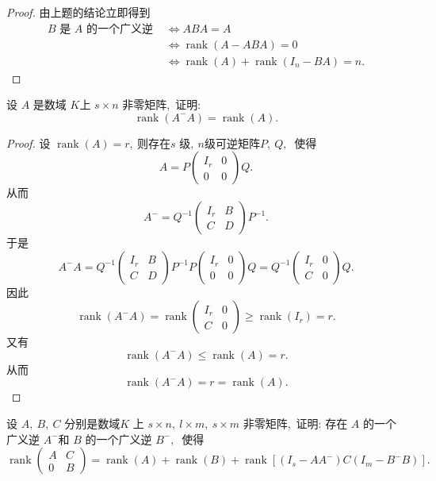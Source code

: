 \begin{proof}
	由上题的结论立即得到
	$$\begin{aligned}
		B \text { 是 } A \text { 的一个广义逆 } & \Longleftrightarrow A B A=A \\
		& \Longleftrightarrow \operatorname{rank}(A-A B A)=0 \\
		& \Longleftrightarrow \operatorname{rank}(A)+\operatorname{rank}\left(I_{n}-B A\right)=n .
	\end{aligned}$$
\end{proof}
\newpage
\begin{problem}
	设  $A$  是数域 $ K  $上 $ s \times n $ 非零矩阵,\  证明:
	$$\operatorname{rank}\left(A^{-} A\right)=\operatorname{rank}(A) .$$
\end{problem}
\begin{proof}
	设 $ \operatorname{rank}(A)=r ,\  $则存在$  s $ 级$,\ n  $级可逆矩阵$  P,\  Q ,\ $ 使得
	$$A=P\left(\begin{array}{ll}
		I_{r} & 0 \\
		0 & 0
	\end{array}\right) Q .$$
	从而
	$$A^{-}=Q^{-1}\left(\begin{array}{ll}
		I_{r} & B \\
		C & D
	\end{array}\right) P^{-1} .$$
	于是
	$$A^{-} A=Q^{-1}\left(\begin{array}{ll}
		I_{r} & B \\
		C & D
	\end{array}\right) P^{-1} P\left(\begin{array}{cc}
		I_{r} & 0 \\
		0 & 0
	\end{array}\right) Q=Q^{-1}\left(\begin{array}{ll}
		I_{r} & 0 \\
		C & 0
	\end{array}\right) Q .$$
	因此
	$$ \operatorname{rank}\left(A^{-} A\right)=\operatorname{rank}\left(\begin{array}{ll}I_{r} & 0 \\ C & 0\end{array}\right) \geqslant \operatorname{rank}\left(I_{r}\right)=r .$$
	又有
	$$\operatorname{rank}(A^-A)\leqslant\operatorname{rank}(A)=r.$$
	从而  
	$$\operatorname{rank}\left(A^{-} A\right)=r=\operatorname{rank}(A) .$$
\end{proof}
\newpage
\begin{problem}
	设 $ A ,\ B ,\  C$  分别是数域$  K $ 上  $s \times n,\  l \times m,\  s \times m $ 非零矩阵,\  证明: 存在  $A $ 的一个 广义逆 $ A^{-} $和 $ B $ 的一个广义逆 $ B^{-} ,\ $ 使得
	$$\operatorname{rank}\left(\begin{array}{ll}
		A & C \\
		0 & B
	\end{array}\right)=\operatorname{rank}(A)+\operatorname{rank}(B)+\operatorname{rank}\left[\left(I_{s}-A A^{-}\right) C\left(I_{m}-B^{-} B\right)\right] .$$
\end{problem}
